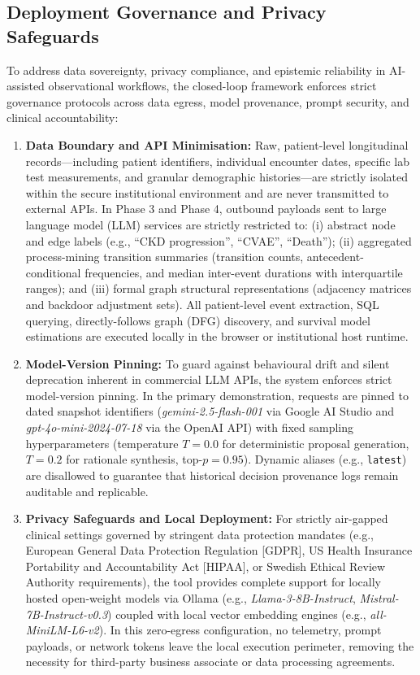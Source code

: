 \subsection{Deployment Governance and Privacy Safeguards}
\label{sec:deployment_governance}

To address data sovereignty, privacy compliance, and epistemic reliability in AI-assisted observational workflows, the closed-loop framework enforces strict governance protocols across data egress, model provenance, prompt security, and clinical accountability:

\begin{enumerate}
    \item \textbf{Data Boundary and API Minimisation:} Raw, patient-level longitudinal records---including patient identifiers, individual encounter dates, specific lab test measurements, and granular demographic histories---are strictly isolated within the secure institutional environment and are never transmitted to external APIs. In Phase 3 and Phase 4, outbound payloads sent to large language model (LLM) services are strictly restricted to: (i) abstract node and edge labels (e.g., ``CKD progression'', ``CVAE'', ``Death''); (ii) aggregated process-mining transition summaries (transition counts, antecedent-conditional frequencies, and median inter-event durations with interquartile ranges); and (iii) formal graph structural representations (adjacency matrices and backdoor adjustment sets). All patient-level event extraction, SQL querying, directly-follows graph (DFG) discovery, and survival model estimations are executed locally in the browser or institutional host runtime.
    
    \item \textbf{Model-Version Pinning:} To guard against behavioural drift and silent deprecation inherent in commercial LLM APIs, the system enforces strict model-version pinning. In the primary demonstration, requests are pinned to dated snapshot identifiers (\textit{gemini-2.5-flash-001} via Google AI Studio and \textit{gpt-4o-mini-2024-07-18} via the OpenAI API) with fixed sampling hyperparameters (temperature $T = 0.0$ for deterministic proposal generation, $T = 0.2$ for rationale synthesis, top-$p = 0.95$). Dynamic aliases (e.g., \texttt{latest}) are disallowed to guarantee that historical decision provenance logs remain auditable and replicable.
    
    \item \textbf{Privacy Safeguards and Local Deployment:} For strictly air-gapped clinical settings governed by stringent data protection mandates (e.g., European General Data Protection Regulation [GDPR], US Health Insurance Portability and Accountability Act [HIPAA], or Swedish Ethical Review Authority requirements), the tool provides complete support for locally hosted open-weight models via Ollama (e.g., \textit{Llama-3-8B-Instruct}, \textit{Mistral-7B-Instruct-v0.3}) coupled with local vector embedding engines (e.g., \textit{all-MiniLM-L6-v2}). In this zero-egress configuration, no telemetry, prompt payloads, or network tokens leave the local execution perimeter, removing the necessity for third-party business associate or data processing agreements.
    

\end{enumerate}
